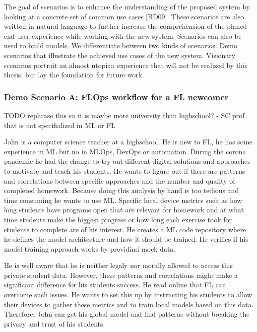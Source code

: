 The goal of scenarios is to enhance the understanding of the proposed system by looking at a concrete set of common use cases [BD09].
These scenarios are also written in natural language to further increase the comprehension of the planed end user experience while working with the new system.
Scenarios can also be used to build models. We differentiate between two kinds of scenarios.
Demo scenarios that illustrate the achieved use cases of the new system.
Visionary scenarios portrait an almost utopian experience that will not be realized by this thesis, but lay the foundation for future work.



\subsubsection{Demo Scenario A: FLOps workflow for a FL newcomer}

TODO rephrase this so it is maybe more university than highschool? - SC prof that is not specifialized in ML or FL

John is a computer science teacher at a highschool.
He is new to FL, he has some experience in ML but no in MLOps, DevOps or automation.
During the corona pandemic he had the change to try out different digital solutions and approaches to motivate and teach his students.
He wants to figure out if there are patterns and correlations between specific approaches and the number and quality of completed homework.
Because doing this analysis by hand is too tedious and time consuming he wants to use ML.
Specific local device metrics such as how long students have programs open that are relevant for homework and at what time students make the biggest progress
or how long each exercise took for students to complete are of his interest.
He creates a ML code repository where he defines the model architecture and how it should be trained.
He verifies if his model training approach works by providind mock data.

He is well aware that he is neither legaly nor morally allowed to access this private student data.
However, these patterns and correlations might make a significant difference for his students success.
He read online that FL can overcome such issues.
He wants to set this up by instructing his students to allow their devices to gather these metrics and to train local models based on this data.
Therefore, John can get his global model and find patterns without breaking the privacy and trust of his students.

